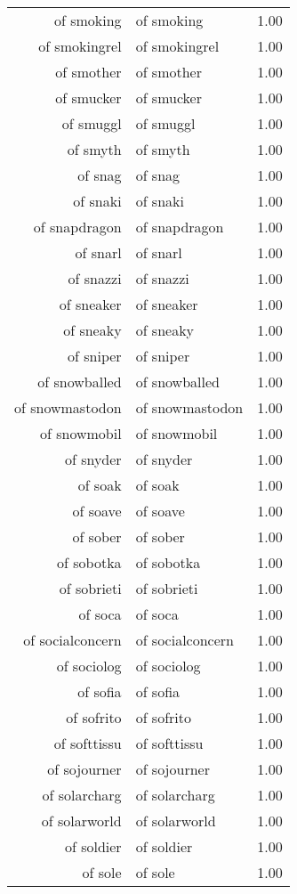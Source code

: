 \begin{table}[ht]
\begin{tabular}{rlr}
  of smoking & of smoking & 1.00 \\ 
  of smokingrel & of smokingrel & 1.00 \\ 
  of smother & of smother & 1.00 \\ 
  of smucker & of smucker & 1.00 \\ 
  of smuggl & of smuggl & 1.00 \\ 
  of smyth & of smyth & 1.00 \\ 
  of snag & of snag & 1.00 \\ 
  of snaki & of snaki & 1.00 \\ 
  of snapdragon & of snapdragon & 1.00 \\ 
  of snarl & of snarl & 1.00 \\ 
  of snazzi & of snazzi & 1.00 \\ 
  of sneaker & of sneaker & 1.00 \\ 
  of sneaky & of sneaky & 1.00 \\ 
  of sniper & of sniper & 1.00 \\ 
  of snowballed & of snowballed & 1.00 \\ 
  of snowmastodon & of snowmastodon & 1.00 \\ 
  of snowmobil & of snowmobil & 1.00 \\ 
  of snyder & of snyder & 1.00 \\ 
  of soak & of soak & 1.00 \\ 
  of soave & of soave & 1.00 \\ 
  of sober & of sober & 1.00 \\ 
  of sobotka & of sobotka & 1.00 \\ 
  of sobrieti & of sobrieti & 1.00 \\ 
  of soca & of soca & 1.00 \\ 
  of socialconcern & of socialconcern & 1.00 \\ 
  of sociolog & of sociolog & 1.00 \\ 
  of sofia & of sofia & 1.00 \\ 
  of sofrito & of sofrito & 1.00 \\ 
  of softtissu & of softtissu & 1.00 \\ 
  of sojourner & of sojourner & 1.00 \\ 
  of solarcharg & of solarcharg & 1.00 \\ 
  of solarworld & of solarworld & 1.00 \\ 
  of soldier & of soldier & 1.00 \\ 
  of sole & of sole & 1.00 \\ 

\end{tabular}
\end{table}
